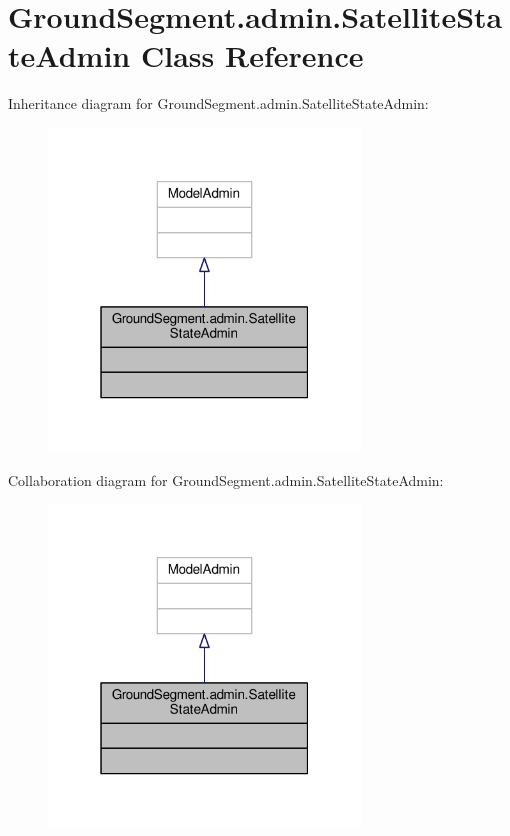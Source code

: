 \hypertarget{class_ground_segment_1_1admin_1_1_satellite_state_admin}{}\section{Ground\+Segment.\+admin.\+Satellite\+State\+Admin Class Reference}
\label{class_ground_segment_1_1admin_1_1_satellite_state_admin}


Inheritance diagram for Ground\+Segment.\+admin.\+Satellite\+State\+Admin\+:\nopagebreak
\begin{figure}[H]
\begin{center}
\leavevmode
\includegraphics[width=235pt]{class_ground_segment_1_1admin_1_1_satellite_state_admin__inherit__graph}
\end{center}
\end{figure}


Collaboration diagram for Ground\+Segment.\+admin.\+Satellite\+State\+Admin\+:\nopagebreak
\begin{figure}[H]
\begin{center}
\leavevmode
\includegraphics[width=235pt]{class_ground_segment_1_1admin_1_1_satellite_state_admin__coll__graph}
\end{center}
\end{figure}


